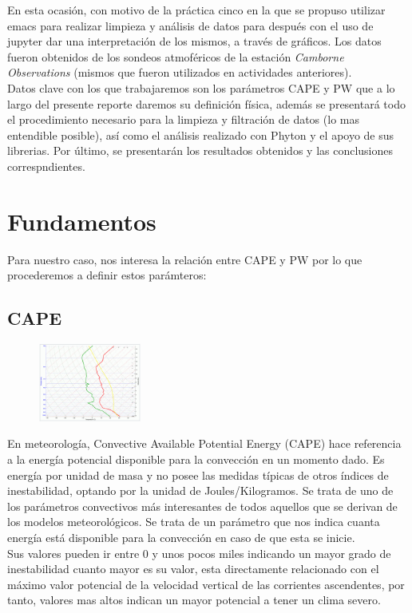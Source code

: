 \documentclass[12pt]{article}
\begin{document}
En esta ocasión, con motivo de la práctica cinco en la que se propuso utilizar emacs para realizar limpieza y análisis de datos para después con el uso de jupyter dar una interpretación de los mismos, a través de gráficos. Los datos fueron obtenidos de los sondeos atmoféricos de la estación \textit{Camborne Observations} (mismos que fueron utilizados en actividades anteriores).\\

Datos clave con los que trabajaremos son los parámetros CAPE y PW que a lo largo del presente reporte daremos su definición física, además se presentará todo el procedimiento necesario para la limpieza y filtración de datos (lo mas entendible posible), así como el análisis realizado con Phyton y el apoyo de sus librerias. Por último, se presentarán los resultados obtenidos y las conclusiones correspndientes.

\section*{Fundamentos}
Para nuestro caso, nos interesa la relación entre CAPE y PW por lo que procederemos a definir estos parámteros:
\subsection*{CAPE}
\begin{figure}
    \centering
    \includegraphics[width=0.3\textwidth]{CAPE.png}
\end{figure}
En meteorología, Convective Available Potential Energy (CAPE) hace referencia a la energía potencial disponible para la convección en un momento dado. Es energía por unidad de masa y no posee las medidas típicas de otros índices de inestabilidad, optando por la unidad de Joules/Kilogramos. Se trata de uno de los parámetros convectivos más interesantes de todos aquellos que se derivan de los modelos meteorológicos. Se trata de un parámetro que nos indica cuanta energía está disponible para la convección en caso de que esta se inicie.\\

Sus valores pueden ir entre 0 y unos pocos miles indicando un mayor grado de inestabilidad cuanto mayor es su valor, esta directamente relacionado con el máximo valor potencial de la velocidad vertical de las corrientes ascendentes, por tanto, valores mas altos indican un mayor potencial a tener un clima severo.
\end{document}
